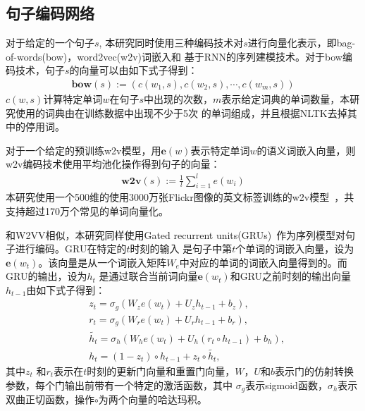 \subsection{句子编码网络}
对于给定的一个句子$s$, 本研究同时使用三种编码技术对$s$进行向量化表示，即bag-of-words(bow)，word2vec(w2v)词嵌入和
基于RNN的序列建模技术。对于bow编码技术，句子$s$的向量可以由如下式子得到：
\begin{equation}
    \label{eq:bow}
    \begin{aligned}
        \bm{\mathbf{bow}}(s) := (c(w_1,s),c(w_2,s),\cdots,c(w_m,s))
    \end{aligned}
\end{equation}
$c(w,s)$计算特定单词$w$在句子$s$中出现的次数，$m$表示给定词典的单词数量，本研究使用的词典由在训练数据中出现不少于5次
的单词组成，并且根据NLTK去掉其中的停用词。

对于一个给定的预训练w2v模型，用$\bm{\mathbf{e}}(w)$表示特定单词$w$的语义词嵌入向量，则w2v编码技术使用平均池化操作得到句子的向量：
\begin{equation}
    \label{eq:w2v}
    \begin{aligned}
        \bm{\mathbf{w2v}}(s) := \frac{1}{l}\sum^l_{i=1}e(w_i)
    \end{aligned}
\end{equation}
本研究使用一个500维的使用3000万张Flickr图像的英文标签训练的w2v模型~\cite{dong2018predicting}，共支持超过170万个常见的单词向量化。

和W2VV相似，本研究同样使用Gated recurrent units(GRUs)~\cite{cho2014learning}作为序列模型对句子进行编码。GRU在特定的$t$时刻的输入
是句子中第$t$个单词的词嵌入向量，设为$\bm{\mathbf{e}}(w_t)$。该向量是从一个词嵌入矩阵$W_e$中对应的单词的词嵌入向量得到的。而GRU的输出，设为$h_t$
是通过联合当前词向量$\bm{\mathbf{e}}(w_t)$和GRU之前时刻的输出向量$h_{t-1}$由如下式子得到：
\begin{equation}
    \label{eq:gru}
    \begin{aligned}
        & z_t = \sigma_g(W_z e(w_t) + U_z h_{t-1} + b_z), \\
        & r_t = \sigma_g(W_r e(w_t) + U_r h_{t-1} + b_r), \\
        & \widetilde{h_t} = \sigma_h(W_h e(w_t) + U_h (r_t \circ h_{t-1}) + b_h), \\
        & h_t = (1-z_t) \circ h_{t-1} + z_t \circ \widetilde{h_t},
    \end{aligned}
\end{equation}
其中$z_t$ 和$r_t$表示在$t$时刻的更新门向量和重置门向量，$W$，$U$和$b$表示门的仿射转换参数，每个门输出前带有一个特定的激活函数，其中
$\sigma_g$表示sigmoid函数，$\sigma_h$表示双曲正切函数，操作$\circ$为两个向量的哈达玛积。

